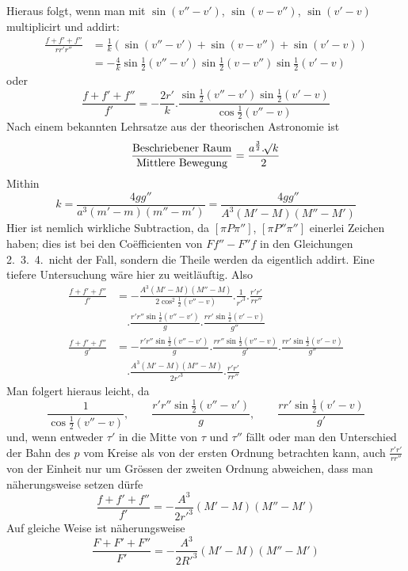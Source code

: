 Hieraus folgt, wenn man mit $\sin(v''-v')$, $\sin(v-v'')$, $\sin(v'-v)$ multiplicirt und addirt:
\[
\begin{aligned}
\frac{f+f'+f''}{rr'r''}&=\frac1k(\sin(v''-v')+\sin(v-v'')+\sin(v'-v))\\
&=-\frac4k\sin\tfrac12(v''-v')\sin\tfrac12(v-v'')\sin\tfrac12(v'-v)
\end{aligned}
\]
oder
\[
\frac{f+f'+f''}{f'}=-\frac{2r'}k.\frac{\sin\tfrac12(v''-v')\sin\tfrac12(v'-v)}{\cos\tfrac12(v''-v)}
\]
Nach einem bekannten Lehrsatze aus der theorischen Astronomie ist
\[
\frac{\text{Beschriebener Raum}}{\text{Mittlere Bewegung}}=\frac{a^{\frac32}.\mathord{{}^{}\!\surd}k}2
\]
Mithin
\[
k=\frac{4gg''}{a^3(m'-m)(m''-m')}=\frac{4gg''}{A^3(M'-M)(M''-M')}
\]
%
\expandafter\def\csname HistoricalNoteText11\endcsname{Hier ist nemlich wirkliche Subtraction, da $[\pi P\pi'']$, $[\pi P''\pi'']$ einerlei Zeichen haben; dies ist bei den Coëfficienten von $Ff''-F''f$ in den Gleichungen 2.\ 3.\ 4.\ nicht der Fall, sondern die Theile werden da eigentlich addirt. Eine tiefere Untersuchung wäre hier zu weitläuftig.}%
Also
\[
\begin{aligned}
\frac{f+f'+f''}{f'}&=-\frac{A^3(M'-M)(M''-M)}{2\cos^2\tfrac12(v''-v)}.\frac1{r'^3}.\frac{r'r'}{rr''}\\&\quad.\frac{r'r''\sin\tfrac12(v''-v')}{g}.\frac{rr'\sin\tfrac12(v'-v)}{g''}\\
\frac{f+f'+f''}{g'}&=-\frac{r'r''\sin\tfrac12(v''-v')}{g}.\frac{rr''\sin\tfrac12(v''-v)}{g'}.\frac{rr'\sin\tfrac12(v'-v)}{g''}\\&\quad.\frac{A^3(M'-M)(M''-M)}{2r'^3}.\frac{r'r'}{rr''}
\end{aligned}
\]
Man folgert hieraus leicht, da
\[
\frac1{\cos\tfrac12(v''-v)},\qquad\frac{r'r''\sin\tfrac12(v''-v')}{g},\qquad\frac{rr'\sin\tfrac12(v'-v)}{g'}
\]
und, wenn entweder $\tau'$ in die Mitte von $\tau$ und $\tau''$ fällt oder man den Unterschied der Bahn des $p$ vom Kreise als von der ersten Ordnung betrachten kann, auch $\frac{r'r'}{rr''}$ von der Einheit nur um Grössen der zweiten Ordnung abweichen, dass man näherungsweise setzen dürfe
\[
\frac{f+f'+f''}{f'}=-\frac{A^3}{2r'^3}(M'-M)(M''-M')
\]
Auf gleiche Weise ist näherungsweise
\[
\frac{F+F'+F''}{F'}=-\frac{A^3}{2R'^3}(M'-M)(M''-M')
\]

